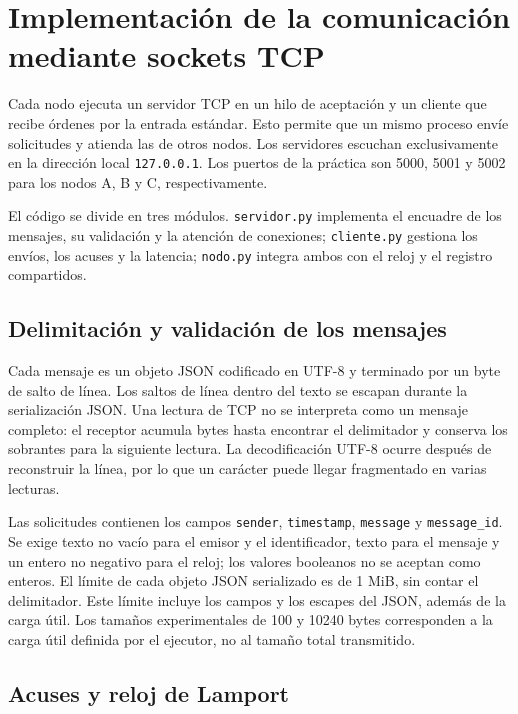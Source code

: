 \section{Implementación de la comunicación mediante sockets TCP}
\label{sec:sockets}

Cada nodo ejecuta un servidor TCP en un hilo de aceptación y un cliente que
recibe órdenes por la entrada estándar. Esto permite que un mismo proceso
envíe solicitudes y atienda las de otros nodos. Los servidores escuchan
exclusivamente en la dirección local \texttt{127.0.0.1}. Los puertos de la
práctica son 5000, 5001 y 5002 para los nodos A, B y C, respectivamente.

El código se divide en tres módulos. \texttt{servidor.py} implementa el
encuadre de los mensajes, su validación y la atención de conexiones;
\texttt{cliente.py} gestiona los envíos, los acuses y la latencia;
\texttt{nodo.py} integra ambos con el reloj y el registro compartidos.

\subsection{Delimitación y validación de los mensajes}

Cada mensaje es un objeto JSON codificado en UTF-8 y terminado por un byte
de salto de línea. Los saltos de línea dentro del texto se escapan durante
la serialización JSON. Una lectura de TCP no se interpreta como un mensaje
completo: el receptor acumula bytes hasta encontrar el delimitador y
conserva los sobrantes para la siguiente lectura. La decodificación UTF-8
ocurre después de reconstruir la línea, por lo que un carácter puede llegar
fragmentado en varias lecturas.

Las solicitudes contienen los campos \texttt{sender}, \texttt{timestamp},
\texttt{message} y \texttt{message\_id}. Se exige texto no vacío para el
emisor y el identificador, texto para el mensaje y un entero no negativo
para el reloj; los valores booleanos no se aceptan como enteros. El límite
de cada objeto JSON serializado es de 1 MiB, sin contar el delimitador.
Este límite incluye los campos y los escapes del JSON, además de la carga
útil. Los tamaños experimentales de 100 y 10240 bytes corresponden a la
carga útil definida por el ejecutor, no al tamaño total transmitido.

\subsection{Acuses y reloj de Lamport}

